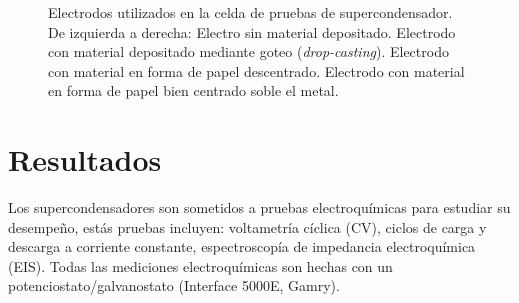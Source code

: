 \begin{figure}
	\centering
	\caption{Electrodos utilizados en la celda de pruebas de supercondensador. De izquierda a derecha: Electro sin material depositado. Electrodo con material depositado mediante goteo (\emph{drop-casting}). Electrodo con material en forma de papel descentrado. Electrodo con material en forma de papel bien centrado soble el metal.}
	\label{fig:electrodes}
\end{figure}

\section{Resultados}
Los supercondensadores son sometidos a pruebas electroquímicas para estudiar su desempeño, estás pruebas incluyen: voltametría cíclica (CV), ciclos de carga y descarga a corriente constante, espectroscopía de impedancia electroquímica (EIS). Todas las mediciones electroquímicas son hechas con un potenciostato/galvanostato (Interface 5000E, Gamry).



